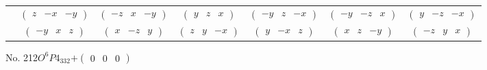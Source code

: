 \documentclass[fleqn,9pt,landscape]{jsarticle}
\begin{document}
\begin{center}
\begin{longtable}{ccccccc}
& $ \begin{pmatrix} z & - x & - y \end{pmatrix} $ & $ \begin{pmatrix} - z & x & - y \end{pmatrix} $ & $ \begin{pmatrix} y & z & x \end{pmatrix} $ & $ \begin{pmatrix} - y & z & - x \end{pmatrix} $ & $ \begin{pmatrix} - y & - z & x \end{pmatrix} $ & $ \begin{pmatrix} y & - z & - x \end{pmatrix} $ \\
& $ \begin{pmatrix} - y & x & z \end{pmatrix} $ & $ \begin{pmatrix} x & - z & y \end{pmatrix} $ & $ \begin{pmatrix} z & y & - x \end{pmatrix} $ & $ \begin{pmatrix} y & - x & z \end{pmatrix} $ & $ \begin{pmatrix} x & z & - y \end{pmatrix} $ & $ \begin{pmatrix} - z & y & x \end{pmatrix} $ \\
\end{longtable}
\end{center}
\newpage
No. 212\quad$O_{}^{6}$\quad$P4_332$\quad[ cubic ]\quad$+\begin{pmatrix} 0 & 0 & 0 \end{pmatrix}$
\end{document}
